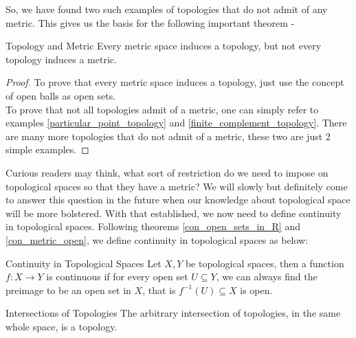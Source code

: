 \noindent So, we have found two such examples of topologies that do not admit of any metric. This gives us the basis for the following important theorem -
\begin{Theorem}{Topology and Metric}\label{every_topology_no_metric}
    Every metric space induces a topology, but not every topology induces a metric.
\end{Theorem}
\begin{proof}
    To prove that every metric space induces a topology, just use the concept of open balls as open sets.\\
    To prove that not all topologies admit of a metric, one can simply refer to examples \eqref{particular_point_topology} and \eqref{finite_complement_topology}. There are many more topologies that do not admit of a metric, these two are just 2 simple examples.
\end{proof}
\noindent Curious readers may think, what sort of restriction do we need to impose on topological spaces so that they have a metric? We will slowly but definitely come to answer this question in the future when our knowledge about topological space will be more bolstered. With that established, we now need to define continuity in topological spaces. Following theorems \eqref{con_open_sets_in_R} and \eqref{con_metric_open}, we define continuity in topological spaces as below:
\begin{Definition}{Continuity in Topological Spaces}\label{con_topological_spaces}
    Let $X, Y$ be topological spaces, then a function $f:X \rightarrow Y$ is continuous if for every open set $U\subseteq Y$, we can always find the preimage to be an open set in $X$, that is $f^{-1}(U)\subseteq X$ is open.
\end{Definition}
\begin{Theorem}{Intersections of Topologies}\label{intersection_topology}
    The arbitrary intersection of topologies, in the same whole space, is a topology.
\end{Theorem}
